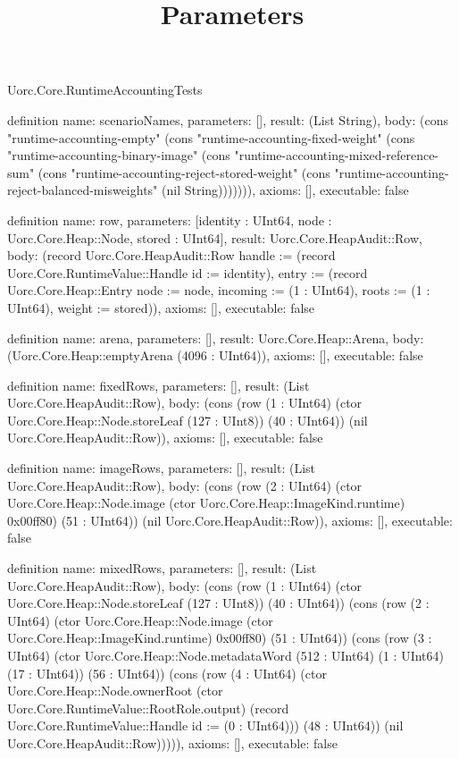 \begin{lexlean}{Uorc.Core.RuntimeAccountingTests}
\title{Parameters}
\begin{semanticmodule}
definition{
  name: scenarioNames,
  parameters: [],
  result: (List String),
  body: (cons "runtime-accounting-empty" (cons "runtime-accounting-fixed-weight" (cons "runtime-accounting-binary-image" (cons "runtime-accounting-mixed-reference-sum" (cons "runtime-accounting-reject-stored-weight" (cons "runtime-accounting-reject-balanced-misweights" (nil String))))))),
  axioms: [],
  executable: false
}

definition{
  name: row,
  parameters: [identity : UInt64, node : Uorc.Core.Heap::Node, stored : UInt64],
  result: Uorc.Core.HeapAudit::Row,
  body: (record Uorc.Core.HeapAudit::Row {handle := (record Uorc.Core.RuntimeValue::Handle {id := identity}), entry := (record Uorc.Core.Heap::Entry {node := node, incoming := (1 : UInt64), roots := (1 : UInt64), weight := stored})}),
  axioms: [],
  executable: false
}

definition{
  name: arena,
  parameters: [],
  result: Uorc.Core.Heap::Arena,
  body: (Uorc.Core.Heap::emptyArena (4096 : UInt64)),
  axioms: [],
  executable: false
}

definition{
  name: fixedRows,
  parameters: [],
  result: (List Uorc.Core.HeapAudit::Row),
  body: (cons (row (1 : UInt64) (ctor Uorc.Core.Heap::Node.storeLeaf (127 : UInt8)) (40 : UInt64)) (nil Uorc.Core.HeapAudit::Row)),
  axioms: [],
  executable: false
}

definition{
  name: imageRows,
  parameters: [],
  result: (List Uorc.Core.HeapAudit::Row),
  body: (cons (row (2 : UInt64) (ctor Uorc.Core.Heap::Node.image (ctor Uorc.Core.Heap::ImageKind.runtime) 0x00ff80) (51 : UInt64)) (nil Uorc.Core.HeapAudit::Row)),
  axioms: [],
  executable: false
}

definition{
  name: mixedRows,
  parameters: [],
  result: (List Uorc.Core.HeapAudit::Row),
  body: (cons (row (1 : UInt64) (ctor Uorc.Core.Heap::Node.storeLeaf (127 : UInt8)) (40 : UInt64)) (cons (row (2 : UInt64) (ctor Uorc.Core.Heap::Node.image (ctor Uorc.Core.Heap::ImageKind.runtime) 0x00ff80) (51 : UInt64)) (cons (row (3 : UInt64) (ctor Uorc.Core.Heap::Node.metadataWord (512 : UInt64) (1 : UInt64) (17 : UInt64)) (56 : UInt64)) (cons (row (4 : UInt64) (ctor Uorc.Core.Heap::Node.ownerRoot (ctor Uorc.Core.RuntimeValue::RootRole.output) (record Uorc.Core.RuntimeValue::Handle {id := (0 : UInt64)})) (48 : UInt64)) (nil Uorc.Core.HeapAudit::Row))))),
  axioms: [],
  executable: false
}


\end{semanticmodule}
\end{lexlean}
